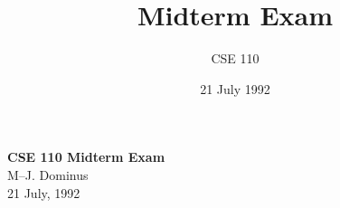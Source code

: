 

\def\brac#1{$<$#1$>$}
\def\Int{{\tt int}}
\def\int{\brac{\Int}}
\def\int{\brac{\Int}}
\def\Shortint{{\tt short~int}}
\def\shortint{\brac{\Shortint}}
\def\Longint{{\tt long~int}}
\def\longint{\brac{\Longint}}
\def\Float{{\tt float}}
\def\float{\brac{\Float}}
\def\Double{{\tt double}}
\def\double{\brac{\Double}}
\def\Char{{\tt char}}
\def\chr{\brac{\Char}}
\def\Void{{\tt void}}
\def\void{\brac{\Void}}

\def\ptr#1{pointer~to #1}
\def\p2#1{\brac{\ptr#1}}
\def\Ano#1#2{array~of {#1}~#2s}
\def\ano#1#2{\brac{\Ano#1#2}}
\def\Ao#1{array~of #1}
\def\ao#1{\brac{\Ao#1}}

\def\breakhere{\mbox{$\otimes$}}
\parskip 8pt


\topmargin -0.5in
\textheight 9in


\title{Midterm Exam}
\author{CSE 110}
\date{21 July 1992}


\setcounter{page}{0}
\begin{center}
{\Large \bf CSE 110 Midterm Exam}\\
\vspace{.2in}
{\large M--J. Dominus}\\
\vspace{.2in}
21 July, 1992
\end{center}


